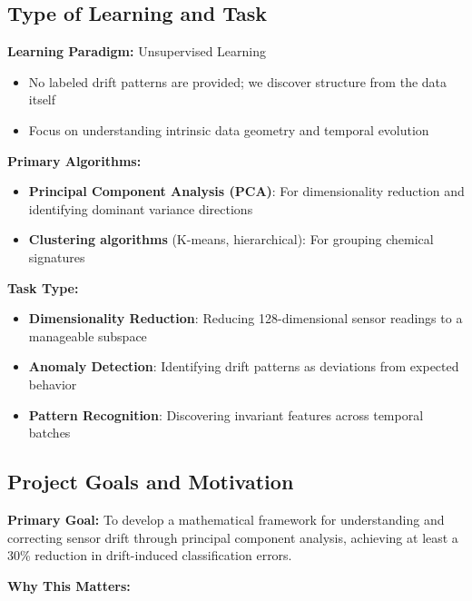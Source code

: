 \documentclass[
  letterpaper,
  DIV=11,
  numbers=noendperiod]{scrartcl}
\providecommand{\tightlist}{%
  \setlength{\itemsep}{0pt}\setlength{\parskip}{0pt}}
\begin{document}
\subsection{Type of Learning and Task}\label{type-of-learning-and-task}

\textbf{Learning Paradigm:} Unsupervised Learning

\begin{itemize}
\tightlist
\item
  No labeled drift patterns are provided; we discover structure from the
  data itself
\item
  Focus on understanding intrinsic data geometry and temporal evolution
\end{itemize}

\textbf{Primary Algorithms:}

\begin{itemize}
\tightlist
\item
  \textbf{Principal Component Analysis (PCA)}: For dimensionality
  reduction and identifying dominant variance directions
\item
  \textbf{Clustering algorithms} (K-means, hierarchical): For grouping
  chemical signatures
\end{itemize}

\textbf{Task Type:}

\begin{itemize}
\tightlist
\item
  \textbf{Dimensionality Reduction}: Reducing 128-dimensional sensor
  readings to a manageable subspace
\item
  \textbf{Anomaly Detection}: Identifying drift patterns as deviations
  from expected behavior
\item
  \textbf{Pattern Recognition}: Discovering invariant features across
  temporal batches
\end{itemize}

\subsection{Project Goals and
Motivation}\label{project-goals-and-motivation}

\textbf{Primary Goal:} To develop a mathematical framework for
understanding and correcting sensor drift through principal component
analysis, achieving at least a 30\% reduction in drift-induced
classification errors.

\textbf{Why This Matters:}
\end{document}
